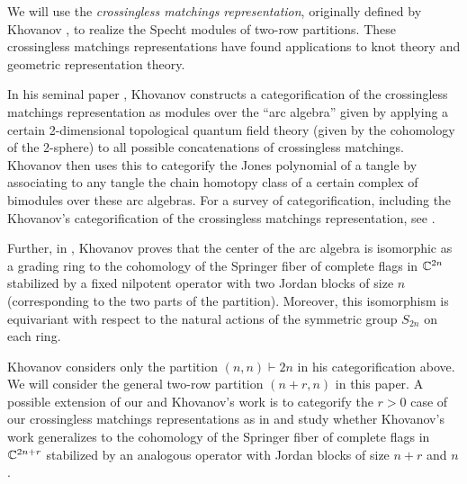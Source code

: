 \documentclass{amsart}
\begin{document}
  We will use the \emph{crossingless matchings representation}, originally defined by Khovanov \cite{Khovanov, Khovanov-tangle, Khovanov-abelian}, to realize the Specht modules of two-row partitions.
  These crossingless matchings representations have found applications to knot theory and geometric representation theory.  

  In his seminal paper \cite{Khovanov-tangle}, Khovanov constructs a categorification of the crossingless matchings representation as modules over the ``arc algebra'' given by applying a certain 2-dimensional topological quantum field theory (given by the cohomology of the 2-sphere) to all possible concatenations of crossingless matchings.
  Khovanov then uses this to categorify the Jones polynomial of a tangle by associating to any tangle the chain homotopy class of a certain complex of bimodules over these arc algebras.
  For a survey of categorification, including the Khovanov's categorification of the crossingless matchings representation, see \cite{Khovanov-abelian}.
  
  Further, in \cite{Khovanov}, Khovanov proves that the center of the arc algebra is isomorphic as a grading ring to the cohomology of the Springer fiber of complete flags in $\mathbb{C}^{2n}$ stabilized by a fixed nilpotent operator with two Jordan blocks of size $n$ (corresponding to the two parts of the partition).
  Moreover, this isomorphism is equivariant with respect to the natural actions of the symmetric group $S_{2n}$ on each ring.

  \begin{remark}
    Khovanov considers only the partition $(n,n) \vdash 2n$ in his categorification above.
    We will consider the general two-row partition $(n+r,n)$ in this paper.
    A possible extension of our and Khovanov's work is to categorify the $r > 0$ case of our crossingless matchings representations as in \cite{Khovanov-tangle} and study whether Khovanov's work generalizes to the cohomology of the Springer fiber of complete flags in $\mathbb{C}^{2n + r}$ stabilized by an analogous operator with Jordan blocks of size $n+r$ and $n$.
  \end{remark}
\end{document}
